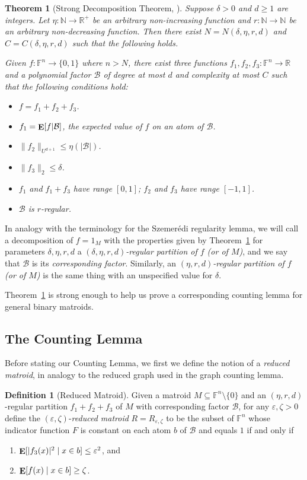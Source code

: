 \documentclass{article}
\theoremstyle{plain}
\newtheorem{thm}[theorem]{Theorem}
\theoremstyle{definition}
\theoremstyle{definition}
\newtheorem{defn}[theorem]{Definition}
\theoremstyle{remark}
\numberwithin{equation}{section}
\newcommand{\FF}{\mathbb{F}}
\newcommand{\F}{\mathbb{F}}
\newcommand{\N}{\mathbb{N}}
\newcommand{\R}{\mathbb{R}}
\newcommand{\Esymb}{{\bf E}}
\DeclareMathOperator*{\E}{\Esymb}
\newcommand{\cB}{\mathcal B}
\begin{document}
\begin{thm}[Strong Decomposition Theorem, {\cite[Theorem~5.1]{VeryCountingMaybe}}]\label{thm:decomp}
Suppose $\delta > 0$ and $ d \geq 1$ are integers. Let $\eta: \N
\to \R^+$ be an arbitrary non-increasing function and $r: \N \to \N$ be an arbitrary
non-decreasing function. Then there exist $N =
N(\delta, \eta, r, d)$ and $C =
C(\delta,\eta,r,d)$ such that the following holds.

Given $f: \F^n \to \{0,1\}$ where $n > N$, there
exist three functions $f_1, f_2, f_3: \F^n \to
\R$ and a polynomial factor  $\cB$ of
degree at most $d$ and complexity at most $C$ such that the following conditions hold:
\begin{itemize}
\item[(i)]
$f=f_1+f_2+f_3$.
\item[(ii)]
$f_1 = \E[f|\cB]$, the expected value of $f$ on an atom of $\cB$.
\item[(iii)]
$\|f_2\|_{U^{d+1}} \leq \eta(|\cB|)$.
\item[(iv)]
$\|f_3\|_2 \leq \delta$.
\item[(v)]
$f_1$ and $f_1 + f_3$ have range $[0,1]$; $f_2$ and $f_3$ have range $[-1,1]$.
\item[(vi)]
$\cB$ is $r$-regular.
\end{itemize}
\end{thm}

In analogy with the terminology for the Szemerédi regularity lemma, we will call a decomposition of $f=1_M$ with the properties given by Theorem~\ref{thm:decomp} for parameters $\delta, \eta, r, d$ a \emph{$(\delta,\eta,r,d)$-regular partition of $f$ (or of $M$)}, and we say that $\cB$ is its \emph{corresponding factor}. Similarly, an \emph{$(\eta,r,d)$-regular partition of $f$ (or of $M$)} is the same thing with an unspecified value for $\delta$.

Theorem~\ref{thm:decomp} is strong enough to help us prove a corresponding counting lemma for general binary matroids.

\subsection{The Counting Lemma} \label{sec:count}
Before stating our Counting Lemma, we first we define the notion of a \emph{reduced matroid}, in analogy to the reduced graph used in the graph counting lemma.

\begin{defn}[Reduced Matroid]
Given a matroid $M\subseteq \FF^n\setminus \{0\}$ and an $(\eta,r,d)$-regular partition $f_1+f_2+f_3$ of $M$ with corresponding factor $\cB$, for any $\varepsilon,\zeta>0$ define the $(\varepsilon,\zeta)$-\emph{reduced matroid} $R=R_{\varepsilon, \zeta}$ to be the subset of $\FF^n$ whose indicator function $F$ is constant on each atom $b$ of $\cB$ and equals $1$ if and only if
\begin{enumerate}
    \item $\E[|f_3(x)|^2\mid x\in b]\leq \varepsilon^2$, and
    \item $\E[f(x)\mid x\in b]\geq \zeta$.
\end{enumerate}
\end{defn}
\end{document}
